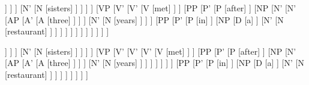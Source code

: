 \documentclass{article}
\begin{document}
	\begin{forest}
		[S
			[NP
				[N'
					[AP
						[A'
							[A
								[two]
							]
						]
					]
					[N'
						[N
							[sisters]
						]
					]
				]
			]
			[VP
				[V'
					[V'
						[V
							[met]
						]
					]
					[PP
						[P'
							[P
								[after]
							]
							[NP
								[N'
									[N'
										[AP
											[A'
												[A
													[three]
												]
											]
										]
										[N'
											[N
												[years]
											]
										]
									]
									[PP
										[P'
											[P
												[in]
											]
											[NP
												[D
													[a]
												]
												[N'
													[N
														[restaurant]
													]
												]
											]
										]
									]
								]
							]
						]
					]
				]
			]
		]
	\end{forest}
	\begin{forest}
		[S
			[NP
				[N'
					[AP
						[A'
							[A
								[two]
							]
						]
					]
					[N'
						[N
							[sisters]
						]
					]
				]
			]
			[VP
				[V'
					[V'
						[V'
							[V
								[met]
							]
						]
						[PP
							[P'
								[P
									[after]
								]
								[NP
									[N'
										[AP
											[A'
												[A
													[three]
												]
											]
										]
										[N'
											[N
												[years]
											]
										]
									]
								]
							]
						]
					]
					[PP
						[P'
							[P
								[in]
							]
							[NP
								[D
									[a]
								]
								[N'
									[N
										[restaurant]
									]
								]
							]
						]
					]
				]
			]
		]
	\end{forest}
\end{document}
